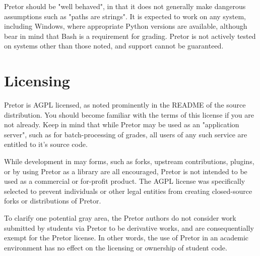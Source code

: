 \documentclass{book}
\begin{document}
Pretor should be "well behaved", in that it does not generally make dangerous
assumptions such as "paths are strings". It is expected to work on any system,
including Windows, where appropriate Python versions are available, although
bear in mind that Bash is a requirement for grading. Pretor is not actively
tested on systems other than those noted, and support cannot be guaranteed.

\section{Licensing}


Pretor is AGPL licensed, as noted prominently in the README of the source
distribution. You should become familiar with the terms of this license if you
are not already. Keep in mind that while Pretor may be used as an
"application server", such as for batch-processing of grades, all users of any
such service are entitled to it's source code.

While development in may forms, such as forks, upstream contributions, plugins,
or by using Pretor as a library are all encouraged, Pretor is not intended to
be used as a commercial or for-profit product. The AGPL license was
specifically selected to prevent individuals or other legal entities from
creating closed-source forks or distributions of Pretor.

To clarify one potential gray area, the Pretor authors do not consider work
submitted by students via Pretor to be derivative works, and are
consequentially exempt for the Pretor license. In other words, the use of
Pretor in an academic environment has no effect on the licensing or ownership
of student code.
\end{document}
